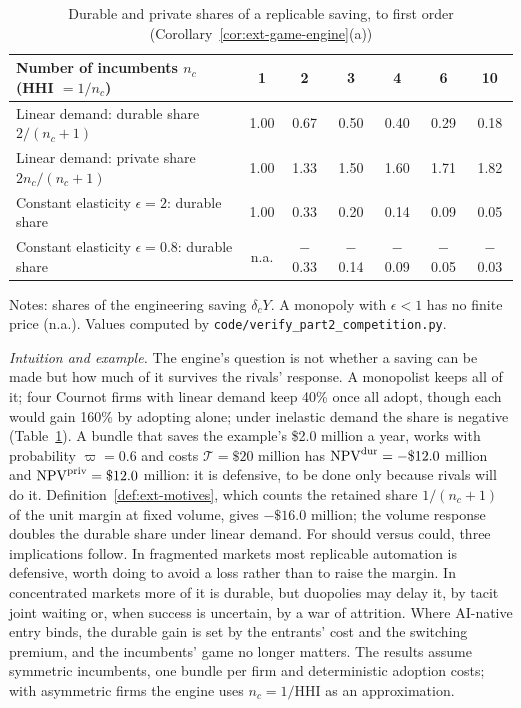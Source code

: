 \begin{table}[t]
\centering
\caption{Durable and private shares of a replicable saving, to first order (Corollary~\ref{cor:ext-game-engine}(a))}\label{tab:ext-game-dur}
\footnotesize
\begin{tabular}{@{}lcccccc@{}}
\toprule
Number of incumbents $n_c$ (HHI $=1/n_c$) & 1 & 2 & 3 & 4 & 6 & 10\\
\midrule
Linear demand: durable share $2/(n_c+1)$ & 1.00 & 0.67 & 0.50 & 0.40 & 0.29 & 0.18\\
Linear demand: private share $2n_c/(n_c+1)$ & 1.00 & 1.33 & 1.50 & 1.60 & 1.71 & 1.82\\
Constant elasticity $\epsilon=2$: durable share & 1.00 & 0.33 & 0.20 & 0.14 & 0.09 & 0.05\\
Constant elasticity $\epsilon=0.8$: durable share & n.a. & $-$0.33 & $-$0.14 & $-$0.09 & $-$0.05 & $-$0.03\\
\bottomrule
\end{tabular}

\smallskip
\begin{minipage}{0.92\linewidth}\footnotesize
Notes: shares of the engineering saving $\delta_cY$. A monopoly with $\epsilon<1$ has no finite price (n.a.). Values computed by \texttt{code/verify\_part2\_competition.py}.
\end{minipage}
\end{table}

\noindent\emph{Intuition and example.} The engine's question is not whether a saving can be made but how much of it survives the rivals' response. A monopolist keeps all of it; four Cournot firms with linear demand keep 40\% once all adopt, though each would gain 160\% by adopting alone; under inelastic demand the share is negative (Table~\ref{tab:ext-game-dur}). A bundle that saves the example's \$2.0 million a year, works with probability $\varpi=0.6$ and costs $\mathcal T=\$20$ million has $\mathrm{NPV}^{\rm dur}=-\$12.0$ million and $\mathrm{NPV}^{\rm priv}=\$12.0$ million: it is defensive, to be done only because rivals will do it. Definition~\ref{def:ext-motives}, which counts the retained share $1/(n_c+1)$ of the unit margin at fixed volume, gives $-\$16.0$ million; the volume response doubles the durable share under linear demand. For should versus could, three implications follow. In fragmented markets most replicable automation is defensive, worth doing to avoid a loss rather than to raise the margin. In concentrated markets more of it is durable, but duopolies may delay it, by tacit joint waiting or, when success is uncertain, by a war of attrition. Where AI-native entry binds, the durable gain is set by the entrants' cost and the switching premium, and the incumbents' game no longer matters. The results assume symmetric incumbents, one bundle per firm and deterministic adoption costs; with asymmetric firms the engine uses $n_c=1/\mathrm{HHI}$ as an approximation.

